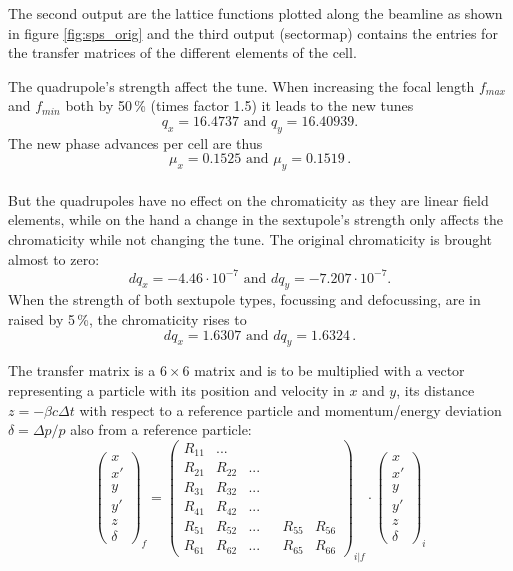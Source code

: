The second output are the lattice functions plotted along the beamline as shown in figure \ref{fig:sps_orig} and the third output (sectormap) contains the entries for the transfer matrices of the different elements of the cell.
\par
The quadrupole's strength affect the tune. When increasing the focal length $f_{max}$ and $f_{min}$ both by 50\,\% (times factor 1.5) it leads to the new tunes $$q_x=16.4737\text{ and }q_y=16.40939.$$ The new phase advances per cell are thus $$\mu_x=0.1525\text{ and }\mu_y=0.1519\,.$$\\
But the quadrupoles have no effect on the chromaticity as they are linear field elements, while on the hand a change in the sextupole's strength only affects the chromaticity while not changing the tune.
The original chromaticity is brought almost to zero: $$dq_x=-4.46\cdot 10^{-7}\text{ and }dq_y=-7.207\cdot 10^{-7}.$$ When the strength of both sextupole types, focussing and defocussing, are in raised by 5\,\%, the chromaticity rises to $$dq_x=1.6307\text{ and }dq_y=1.6324\,.$$
\par
The transfer matrix is a $6\times 6$ matrix and is to be multiplied with a vector representing a particle with its position and velocity in $x$ and $y$, its distance $z=-\beta c \Delta t$ with respect to a reference particle and momentum/energy deviation $\delta=\Delta p/p$ also from a reference particle:
\begin{equation}
    \begin{pmatrix}x\\x'\\y\\y'\\z\\\delta\end{pmatrix}_f=\begin{pmatrix}R_{11}&...&&&&\\R_{21}&R_{22}&...&&&\\R_{31}&R_{32}&...&&&\\R_{41}&R_{42}&...&&&\\R_{51}&R_{52}&...&&R_{55}&R_{56}\\R_{61}&R_{62}&...&&R_{65}&R_{66}\end{pmatrix}_{i|f}\cdot \begin{pmatrix}x\\x'\\y\\y'\\z\\\delta\end{pmatrix}_i
\end{equation}
